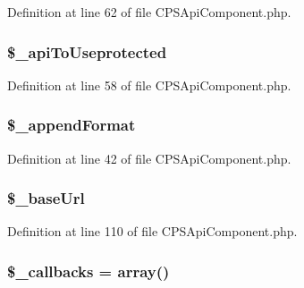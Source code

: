 Definition at line 62 of file CPSApiComponent.php.

\hypertarget{classCPSApiComponent_abdfb5848bea7acb66e39972358f344a8}{
\subsubsection[{\$\_\-apiToUseprotected}]{\setlength{\rightskip}{0pt plus 5cm}\$\_\-apiToUseprotected}}
\label{classCPSApiComponent_abdfb5848bea7acb66e39972358f344a8}


Definition at line 58 of file CPSApiComponent.php.

\hypertarget{classCPSApiComponent_ae027f791b6a2fc198dfabc3e2693f585}{
\subsubsection[{\$\_\-appendFormat}]{\setlength{\rightskip}{0pt plus 5cm}\$\_\-appendFormat}}
\label{classCPSApiComponent_ae027f791b6a2fc198dfabc3e2693f585}


Definition at line 42 of file CPSApiComponent.php.

\hypertarget{classCPSApiComponent_ae5c686cdf8e6a089b6296dcb659f6d01}{
\subsubsection[{\$\_\-baseUrl}]{\setlength{\rightskip}{0pt plus 5cm}\$\_\-baseUrl}}
\label{classCPSApiComponent_ae5c686cdf8e6a089b6296dcb659f6d01}


Definition at line 110 of file CPSApiComponent.php.

\hypertarget{classCPSApiComponent_ae1d5e7a4a34ac8fa4dbdef28983a1fcc}{
\subsubsection[{\$\_\-callbacks}]{\setlength{\rightskip}{0pt plus 5cm}\$\_\-callbacks = {\bf array}()}}
\label{classCPSApiComponent_ae1d5e7a4a34ac8fa4dbdef28983a1fcc}


